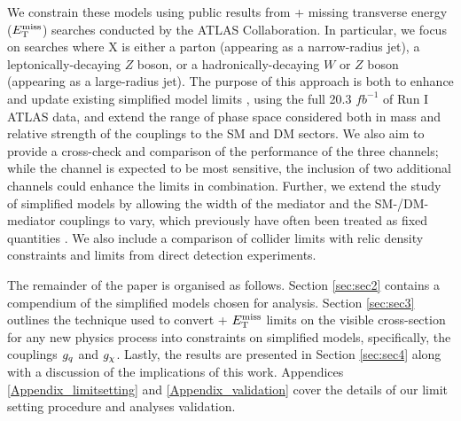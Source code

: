 We constrain these models using public results from \monoX + missing transverse energy ($E_{\mathrm{T}}^{\mathrm{miss}}$) searches conducted by the ATLAS Collaboration. In particular, we focus on searches where X is either a parton (appearing as a narrow-radius jet), a leptonically-decaying $Z$ boson, or a hadronically-decaying $W$ or $Z$ boson (appearing as a large-radius jet). The purpose of this approach is both to enhance and update existing simplified model limits \cite{}, using the full 20.3 $fb^{-1}$ of Run I ATLAS data, and extend the range of phase space considered both in mass and relative strength of the couplings to the SM and DM sectors. We also aim to provide a cross-check and comparison of the performance of the three channels; while the \monojet channel is expected to be most sensitive, the inclusion of two additional channels could enhance the limits in combination. Further, we extend the study of simplified models by allowing the width of the mediator and the SM-/DM-mediator couplings to vary, which previously have often been treated as fixed quantities \cite{}. We also include a comparison of collider limits with relic density constraints and limits from direct detection experiments.

The remainder of the paper is organised as follows. Section \ref{sec:sec2} contains a compendium of the simplified models chosen for analysis. Section \ref{sec:sec3} outlines the technique used to convert \monoX + $E_{\mathrm{T}}^{\mathrm{miss}}$ limits on the visible cross-section for any new physics process into constraints on simplified models, specifically, the couplings $g_q$ and $g_{\chi}$. Lastly, the results are presented in Section \ref{sec:sec4} along with a discussion of the implications of this work. Appendices \ref{Appendix_limitsetting} and \ref{Appendix_validation} cover the details of our limit setting procedure and analyses validation.

